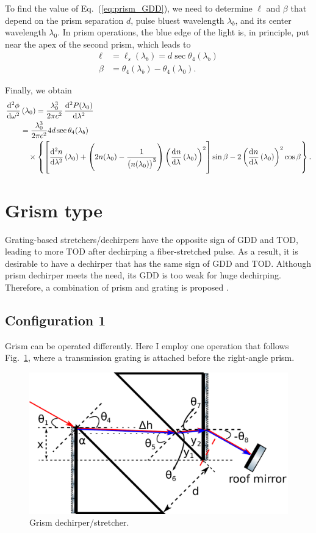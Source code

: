 \documentclass[12pt,hidelinks]{book}
\begin{document}
To find the value of Eq.~(\ref{eq:prism_GDD}), we need to determine $\ell$ and $\beta$ that depend on the prism separation $d$, pulse bluest wavelength $\lambda_b$, and its center wavelength $\lambda_0$. In prism operations, the blue edge of the light is, in principle, put near the apex of the second prism, which leads to
\begin{subequations}
\begin{align}
\ell & =\ell_s(\lambda_b)=d\sec\theta_4(\lambda_b) \\
\beta & =\theta_4(\lambda_b)-\theta_4(\lambda_0).
\end{align}
\end{subequations}

Finally, we obtain
\begin{align}
\dod[2]{\phi}{\omega}(\lambda_0) & =\frac{\lambda_0^3}{2\pi c^2}\dod[2]{P(\lambda_0)}{\lambda} \nonumber \\
&\hspace{-2em} =\frac{\lambda_0^3}{2\pi c^2}4d\sec\theta_4(\lambda_b) \nonumber \\
&\hspace{-1em} \times\left\{\left[\dod[2]{n}{\lambda}(\lambda_0)+\left(2n(\lambda_0)-\frac{1}{\left(n(\lambda_0)\right)^3}\right)\left(\dod{n}{\lambda}(\lambda_0)\right)^2\right]\sin\beta-2\left(\dod{n}{\lambda}(\lambda_0)\right)^2\cos\beta\right\}.
\label{eq:prism_GDD2}
\end{align}

\section{Grism type}
Grating-based stretchers/dechirpers have the opposite sign of GDD and TOD, leading to more TOD after dechirping a fiber-stretched pulse. As a result, it is desirable to have a dechirper that has the same sign of GDD and TOD. Although prism dechirper meets the need, its GDD is too weak for huge dechirping. Therefore, a combination of prism and grating is proposed \cite{Tournois1993,Kane1997,Dou2010,Forget2012}.

\subsection{Configuration 1}
Grism can be operated differently. Here I employ one operation that follows Fig.~\ref{fig:grism}, where a transmission grating is attached before the right-angle prism.

\begin{figure}[htbp]
\centering
\includegraphics[width=.7\linewidth]{grism v2.pdf}
\caption{Grism dechirper/stretcher.}
\label{fig:grism}
\end{figure}
\end{document}
